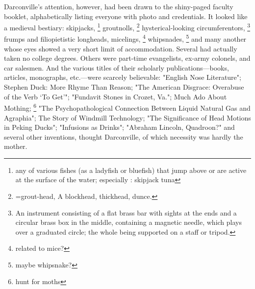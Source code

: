   Darconville's attention, however, had been drawn to the shiny-paged faculty
booklet, alphabetically listing everyone with photo and credentials. It looked
like a medieval bestiary: 
skipjacks, 
\footnote{any of various fishes (as a ladyfish or bluefish) that jump above or
  are active at the surface of the water; especially :  skipjack tuna}
groutnolls, 
\footnote{=grout-head, A blockhead, thickhead, dunce. }
hysterical-looking circumferentors, 
\footnote{An instrument consisting of a flat brass bar with sights at
  the ends and a circular brass box in the middle, containing a magnetic needle,
  which plays over a graduated circle; the whole being supported on a staff or
  tripod.}
frumps 
and filiopietistic 
longheads, micelings, 
\footnote{\textdbend related to mice?}
whipsnades, 
\footnote{\textdbend maybe whipsnake?}
and many another whose eyes showed a very short limit of accommodation. Several had
actually taken no college degrees. Others were part-time evangelists, ex-army
colonels, and car salesmen. And the various titles of their scholarly
publications---books, articles, monographs, etc.---were scarcely believable:
"English Nose Literature"; Stephen Duck: More Rhyme Than Reason; "The American
Disgrace: Overabuse of the Verb `To Get'"; "Fundavit Stones in Crozet, Va.";
Much Ado About Mothing; 
\footnote{hunt for moths}
"The Psychopathological Connection Between Liquid Natural Gas and Agraphia"; 
The Story of Windmill Technology; "The Significance
of Head Motions in Peking Ducks"; "Infusions as Drinks"; "Abraham Lincoln,
Quadroon?" 
and several other inventions, thought Darconville, of which necessity
was hardly the mother.

